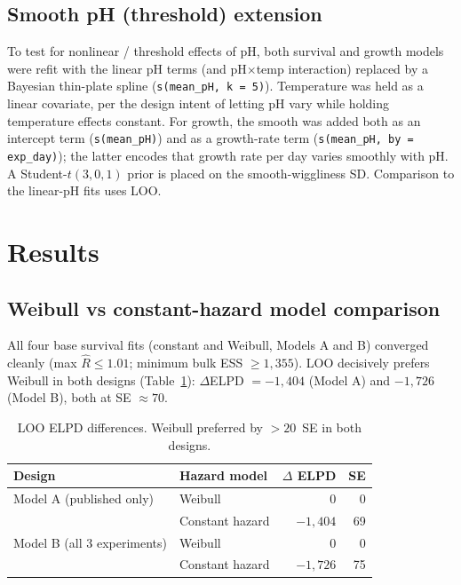 \documentclass[11pt]{article}
\begin{document}
\subsection{Smooth pH (threshold) extension}
\label{sec:smooth_model}
To test for nonlinear / threshold effects of pH, both survival and growth models were refit with the linear pH terms (and pH$\times$temp interaction) replaced by a Bayesian thin-plate spline (\texttt{s(mean\_pH, k = 5)}). Temperature was held as a linear covariate, per the design intent of letting pH vary while holding temperature effects constant. For growth, the smooth was added both as an intercept term (\texttt{s(mean\_pH)}) and as a growth-rate term (\texttt{s(mean\_pH, by = exp\_day)}); the latter encodes that growth rate per day varies smoothly with pH. A Student-$t(3, 0, 1)$ prior is placed on the smooth-wiggliness SD. Comparison to the linear-pH fits uses LOO.

\clearpage
\section{Results}

\subsection{Weibull vs constant-hazard model comparison}
All four base survival fits (constant and Weibull, Models A and B) converged cleanly (max $\hat R \le 1.01$; minimum bulk ESS $\ge 1{,}355$). LOO decisively prefers Weibull in both designs (Table~\ref{tab:loo-weibull}): $\Delta$ELPD $= -1{,}404$ (Model A) and $-1{,}726$ (Model B), both at SE $\approx 70$.

\begin{table}[h]
\centering\small
\begin{tabular}{llrr}
\toprule
Design & Hazard model & $\Delta$ ELPD & SE \\
\midrule
Model A (published only) & Weibull & 0 & 0 \\
                          & Constant hazard & $-1{,}404$ & 69 \\
\midrule
Model B (all 3 experiments) & Weibull & 0 & 0 \\
                            & Constant hazard & $-1{,}726$ & 75 \\
\bottomrule
\end{tabular}
\caption{LOO ELPD differences. Weibull preferred by $>20$~SE in both designs.}
\label{tab:loo-weibull}
\end{table}
\end{document}
